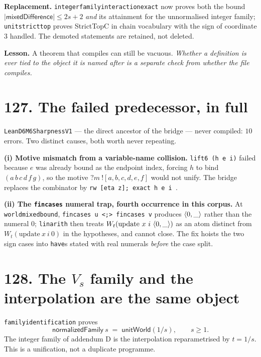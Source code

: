 \documentclass[9pt,twocolumn]{article}
\renewcommand{\_}{\CIGunderscore\allowbreak}
\begin{document}
\textbf{Replacement.} \texttt{integer\_family\_interaction\_exact} now proves both the bound $|\textsf{mixedDifference}|\le 2s+2$ \emph{and} its attainment for the unnormalised integer family; \texttt{unit\_strict\_top} proves \textsf{StrictTopC} in chain vocabulary with the sign of coordinate $3$ handled. The demoted statements are retained, not deleted.

\textbf{Lesson.} A theorem that compiles can still be vacuous. \emph{Whether a definition is ever tied to the object it is named after is a separate check from whether the file compiles.}

\section*{127. The failed predecessor, in full}
\texttt{LeanD6M6SharpnessV1} --- the direct ancestor of the bridge --- never compiled: $10$ errors. Two distinct causes, both worth never repeating.

\textbf{(i) Motive mismatch from a variable-name collision.} \texttt{lift6 (h e i)} failed because $e$ was already bound as the endpoint index, forcing $h$ to bind $(a\,b\,c\,d\,f\,g)$, so the motive $?m\ ![a,b,c,d,e,f]$ would not unify. The bridge replaces the combinator by \texttt{rw [eta z]; exact h e i \_ \_ \_ \_ \_ \_}.

\textbf{(ii) The \texttt{fin\_cases} numeral trap, fourth occurrence in this corpus.} At \texttt{world\_mixed\_bound}, \texttt{fin\_cases u <;> fin\_cases v} produces $\langle 0,\_\rangle$ rather than the numeral $0$; \texttt{linarith} then treats $W_t(\text{update}\ x\ i\ \langle0,\_\rangle)$ as an atom distinct from $W_t(\text{update}\ x\ i\ 0)$ in the hypotheses, and cannot close. The fix hoists the two sign cases into \texttt{have}s stated with real numerals \emph{before} the case split.

\section*{128. The $V_s$ family and the interpolation are the same object}
\texttt{family\_identification} proves
\[\textsf{normalizedFamily}\ s \;=\; \textsf{unitWorld}\!\left(1/s\right),\qquad s\ge1 .\]
The integer family of addendum D is the interpolation reparametrised by $t=1/s$. This is a unification, not a duplicate programme.
\end{document}
